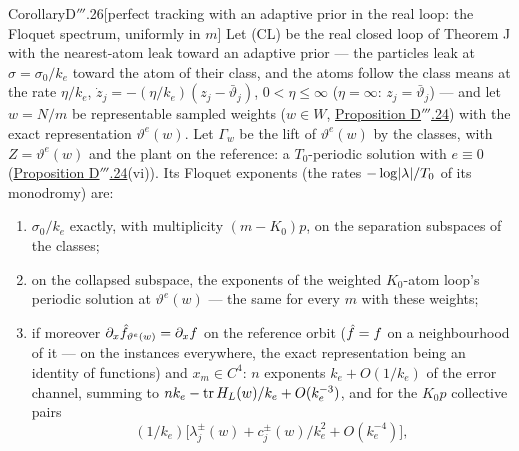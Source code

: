 \begin{thm}{Corollary}{D$'''$.26}[perfect tracking with an adaptive prior in the real loop: the Floquet spectrum,
uniformly in $m$]\label{res:thmDppp:26}%
Let \textup{(CL)} be the real closed loop of Theorem J with the nearest-atom leak toward an adaptive prior --- the
particles leak at $\sigma = \sigma_0/k_e$ toward the atom of their class, and the atoms follow the class means at the
rate $\eta/k_e$, $\dot z_j = -(\eta/k_e)(z_j - \bar\vartheta_j)$, $0 < \eta\le\infty$ ($\eta = \infty$:
$z_j = \bar\vartheta_j$) --- and let $w = N/m$ be representable sampled weights ($w\in W$,
\hyperref[res:thmDppp:24]{Proposition D$'''$.24}) with the exact representation $\vartheta^e(w)$. Let $\Gamma_w$ be
the lift of $\vartheta^e(w)$ by the classes, with $Z = \vartheta^e(w)$ and the plant on the reference: a
$T_0$-periodic solution with $e\equiv0$ (\hyperref[res:thmDppp:24]{Proposition D$'''$.24}(vi)). Its Floquet exponents
(the rates $-\log\lvert \lambda\rvert/T_0$ of its monodromy) are:
\begin{enumerate}[label=\textup{(\alph*)}]
  \item $\sigma_0/k_e$ exactly, with multiplicity $(m - K_0)p$, on the separation subspaces of the classes;
  \item on the collapsed subspace, the exponents of the weighted $K_0$-atom loop's periodic solution at
    $\vartheta^e(w)$ --- the same for every $m$ with these weights;
  \item if moreover $\partial_x\hat f_{\vartheta^e(w)} = \partial_xf$ on the reference orbit ($\hat f = f$ on a
    neighbourhood of it --- on the instances everywhere, the exact representation being an identity of functions)
    and $x_m\in C^4$: $n$ exponents $k_e + O(1/k_e)$ of the error channel, summing to
    $nk_e - \operatorname{tr} H_L(w)/k_e + O(k_e^{-3})$, and for the $K_0p$ collective pairs
    \[
      (1/k_e)\bigl[\lambda_j^\pm(w) + c_j^\pm(w)/k_e^2 + O(k_e^{-4})\bigr],
\]
\end{enumerate}
\end{thm}
